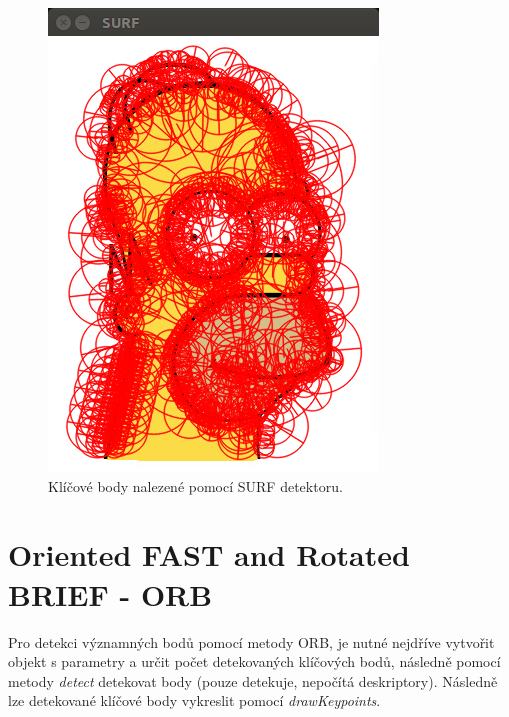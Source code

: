 \documentclass[12pt, a4paper]{article}
\begin{document}
\begin{figure}[!ht]
\begin{minipage}[t]{0.49\textwidth}
		\includegraphics[width = \textwidth]{./surf.png}
		\caption{Klíčové body nalezené pomocí SURF detektoru.}
	\end{minipage}%
\end{figure}

\newpage

\section{Oriented FAST and Rotated BRIEF - ORB}

\par{Pro detekci významných bodů pomocí metody ORB, je nutné nejdříve vytvořit objekt s parametry a určit počet detekovaných klíčových bodů, následně pomocí metody \textit{detect} detekovat body (pouze detekuje, nepočítá deskriptory). Následně lze detekované klíčové body vykreslit pomocí \textit{drawKeypoints}.}
\end{document}

